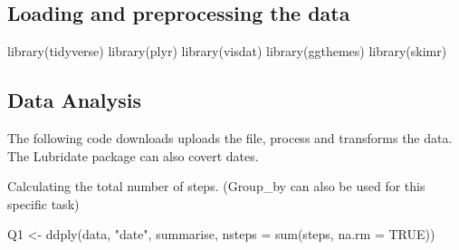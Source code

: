 \documentclass[
]{article}
\newenvironment{Shaded}{\begin{snugshade}}{\end{snugshade}}
\newcommand{\AttributeTok}[1]{\textcolor[rgb]{0.77,0.63,0.00}{#1}}
\newcommand{\ConstantTok}[1]{\textcolor[rgb]{0.00,0.00,0.00}{#1}}
\newcommand{\FunctionTok}[1]{\textcolor[rgb]{0.00,0.00,0.00}{#1}}
\newcommand{\NormalTok}[1]{#1}
\newcommand{\OtherTok}[1]{\textcolor[rgb]{0.56,0.35,0.01}{#1}}
\newcommand{\SpecialCharTok}[1]{\textcolor[rgb]{0.00,0.00,0.00}{#1}}
\newcommand{\StringTok}[1]{\textcolor[rgb]{0.31,0.60,0.02}{#1}}
\begin{document}
\hypertarget{loading-and-preprocessing-the-data}{%
\subsection{Loading and preprocessing the
data}\label{loading-and-preprocessing-the-data}}

\begin{Shaded}
\begin{Highlighting}[]
\FunctionTok{library}\NormalTok{(tidyverse)}
\FunctionTok{library}\NormalTok{(plyr)}
\FunctionTok{library}\NormalTok{(visdat)}
\FunctionTok{library}\NormalTok{(ggthemes)}
\FunctionTok{library}\NormalTok{(skimr)}
\end{Highlighting}
\end{Shaded}

\hypertarget{data-analysis}{%
\subsection{Data Analysis}\label{data-analysis}}

The following code downloads uploads the file, process and transforms
the data. The Lubridate package can also covert dates.

\begin{Shaded}
\end{Shaded}

Calculating the total number of steps. (Group\_by can also be used for
this specific task)

\begin{Shaded}
\begin{Highlighting}[]
\NormalTok{Q1 }\OtherTok{\textless{}{-}} \FunctionTok{ddply}\NormalTok{(data, }\StringTok{"date"}\NormalTok{, summarise,}
            \AttributeTok{nsteps =} \FunctionTok{sum}\NormalTok{(steps, }\AttributeTok{na.rm =} \ConstantTok{TRUE}\NormalTok{))}
\end{Highlighting}
\end{Shaded}
\end{document}
